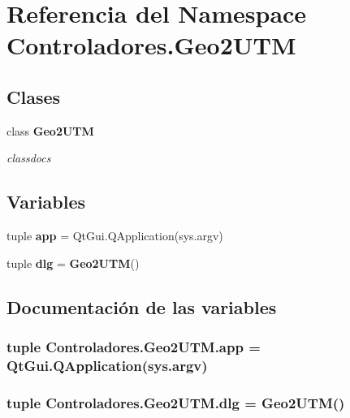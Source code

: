 \section{Referencia del Namespace Controladores.\-Geo2\-U\-T\-M}
\label{namespaceControladores_1_1Geo2UTM}
\subsection*{Clases}
\begin{DoxyCompactItemize}
\item 
class {\bf Geo2\-U\-T\-M}
\begin{DoxyCompactList}\small\item\em classdocs \end{DoxyCompactList}\end{DoxyCompactItemize}
\subsection*{Variables}
\begin{DoxyCompactItemize}
\item 
tuple {\bf app} = Qt\-Gui.\-Q\-Application(sys.\-argv)
\item 
tuple {\bf dlg} = {\bf Geo2\-U\-T\-M}()
\end{DoxyCompactItemize}


\subsection{Documentación de las variables}
\subsubsection[{app}]{\setlength{\rightskip}{0pt plus 5cm}tuple Controladores.\-Geo2\-U\-T\-M.\-app = Qt\-Gui.\-Q\-Application(sys.\-argv)}\label{namespaceControladores_1_1Geo2UTM_a26a32a2b84237eeba8a0262f1b8b0893}
\subsubsection[{dlg}]{\setlength{\rightskip}{0pt plus 5cm}tuple Controladores.\-Geo2\-U\-T\-M.\-dlg = {\bf Geo2\-U\-T\-M}()}\label{namespaceControladores_1_1Geo2UTM_ad0b2a35b05adaac2c9388b44c24207fe}
